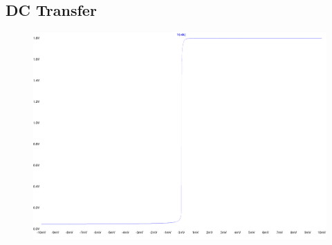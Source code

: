 \subsection{DC Transfer}

\begin{figure}[H]
	\centering
	\includegraphics[width=\textwidth]{./images/DCTransfer-out.pdf}
	\caption{}
	\label{fig:DCtrans}
\end{figure}
